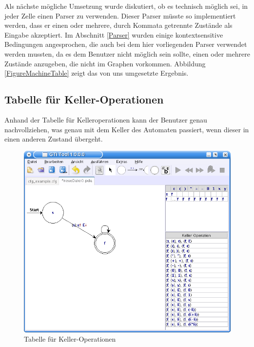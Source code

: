 Als nächste mögliche Umsetzung wurde diskutiert, ob es technisch möglich sei,
in jeder Zelle einen Parser zu verwenden. Dieser Parser müsste so implementiert
werden, dass er einen oder mehrere, durch Kommata getrennte Zustände als Eingabe
akzeptiert. Im Abschnitt \ref{Parser} wurden einige kontextsensitive Bedingungen
angesprochen, die auch bei dem hier vorliegenden Parser verwendet werden
mussten, da es dem Benutzer nicht möglich sein sollte, einen oder mehrere
Zustände anzugeben, die nicht im Graphen vorkommen. Abbildung
\ref{FigureMachineTable} zeigt das von uns umgesetzte Ergebnis.\vspace{10pt}


\subsection{Tabelle für Keller-Operationen}\label{TablesPDA}

Anhand der Tabelle für Kelleroperationen kann der Benutzer genau
nachvollziehen, was genau mit dem Keller des Automaten passiert, wenn dieser
in einen anderen Zustand übergeht.\vspace{10pt}

\begin{figure}[h!]
\begin{center}
\includegraphics[width=12cm]{../images/stack_operation_table.png}
\caption{Tabelle für Keller-Operationen}
\label{FigureStackOperationTable}
\end{center}
\end{figure}
\vspace{10pt}


